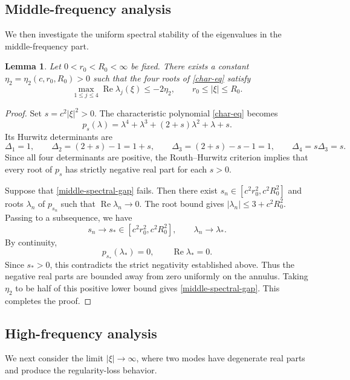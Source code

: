 \documentclass[10pt,reqno]{amsart}
\numberwithin{equation}{section}
\newtheorem{lem}[thm]{Lemma}
\begin{document}
\subsection{Middle-frequency analysis} We then investigate the uniform spectral stability of the eigenvalues in the middle-frequency part.

\begin{lem}\label{lem-middle-gap}
	Let $0<r_0<R_0<\infty$ be fixed. There exists a constant
	$ \eta_2 = \eta_2 (c,r_0,R_0)>0$ such that the four roots of
	\eqref{char-eq} satisfy
	\begin{equation}\label{middle-spectral-gap}
		\max_{1\le j\le4}\operatorname{Re}\lambda_j(\xi)
		\le - 2\eta_2, 
		\qquad r_0\le |\xi|\le R_0.
	\end{equation}
\end{lem}

\begin{proof}
	Set $s=c^2|\xi|^2>0$. The characteristic polynomial \eqref{char-eq} becomes
	\[
	p_s(\lambda)
	=\lambda^4+\lambda^3+(2+s)\lambda^2+\lambda+s.
	\]
	Its Hurwitz determinants are
	\[
	\Delta_1=1,\qquad
	\Delta_2=(2+s)-1=1+s,\qquad
	\Delta_3=(2+s)-s-1=1,\qquad
	\Delta_4=s\Delta_3=s.
	\]
	Since all four determinants are positive, the Routh--Hurwitz
	criterion implies that every root of $p_s$ has strictly negative
	real part for each $s>0$.
	
	Suppose that \eqref{middle-spectral-gap} fails. Then there exist
	$s_n\in[c^2r_0^2,c^2R_0^2]$ and roots $\lambda_n$ of $p_{s_n}$
	such that $\operatorname{Re}\lambda_n\to0$. The  root bound
	gives $|\lambda_n|\le 3+c^2R_0^2$. Passing to a subsequence, we have
	\[
	s_n\to s_*\in[c^2r_0^2,c^2R_0^2],
	\qquad \lambda_n\to\lambda_*.
	\]
	By continuity,
	\[
	p_{s_*}(\lambda_*)=0,
	\qquad \operatorname{Re}\lambda_*=0.
	\]
	Since $s_*>0$, this contradicts the strict negativity established
	above. Thus the negative real parts are bounded away from zero uniformly on the annulus. Taking $\eta_2$ to be half of this positive lower bound gives \eqref{middle-spectral-gap}. This completes the proof. 
\end{proof}



\subsection{High-frequency analysis}
We next consider the limit $|\xi|\to\infty$, where two modes have degenerate real parts and produce the regularity-loss behavior.
\end{document}

